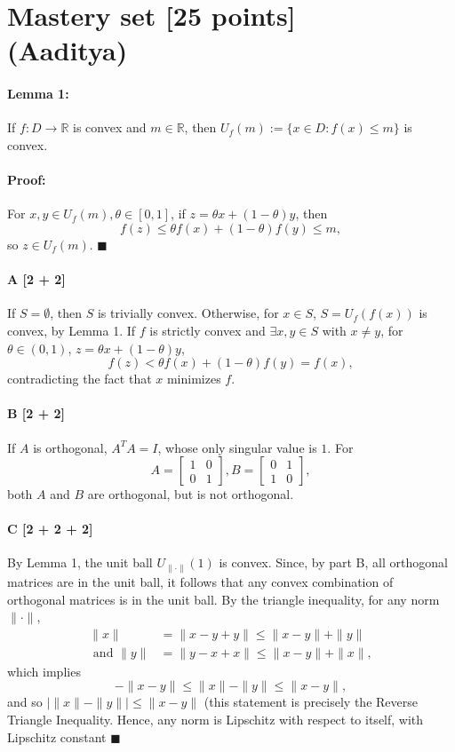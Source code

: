 \documentclass[11pt]{article}
\newcommand{\qed}{\quad \ensuremath{\blacksquare}}
\newcommand{\R}{\mathbb{R}}
\begin{document}
\twocolumn
\section{Mastery set [25 points]\\(Aaditya)}
\paragraph{Lemma 1:} If $f : D \to \R$ is convex and $m \in \R$, then
$U_f(m) := \{ x \in D : f(x) \leq m \}$ is convex.

\paragraph{Proof:} For $x,y \in U_f(m), \theta \in [0,1]$, if
$z=\theta x+(1-\theta)y$, then
\[f(z) \leq \theta f(x) + (1 - \theta)f(y) \leq m,\] so
$z \in U_f(m)$. \qed

\paragraph{A [2 + 2]} If $S = \emptyset$, then $S$ is trivially convex.
Otherwise, for $x \in S$, $S = U_f(f(x))$ is convex, by Lemma 1. If $f$ is
strictly convex and $\exists x,y \in S$ with $x \neq y$, for
$\theta \in (0,1)$, $z = \theta x + (1 - \theta)y$,
\[f(z) < \theta f(x) + (1 - \theta)f(y) = f(x),\]
contradicting the fact that $x$ minimizes $f$.

\paragraph{B [2 + 2]} If $A$ is orthogonal, $A^TA = I$, whose only singular
value is $1$. For
\[A =
\begin{bmatrix}
    1 & 0 \\
    0 & 1
\end{bmatrix},
B =
\begin{bmatrix}
    0 & 1 \\
    1 & 0
\end{bmatrix},
\]
both $A$ and $B$ are orthogonal, but  is not
orthogonal.

\paragraph{C [2 + 2 + 2]} By Lemma 1, the unit ball $U_{\|\cdot\|}(1)$ is
convex. Since, by part B, all orthogonal matrices are in the unit ball, it
follows that any convex combination of orthogonal matrices is in the unit ball.
By the triangle inequality, for any norm $\|\cdot\|$,
\begin{align*}
                \|x\| & = \|x - y + y\| \leq \|x - y\| + \|y\|  \\
\mbox{ and }    \|y\| & = \|y - x + x\| \leq \|x - y\| + \|x\|,
\end{align*}
which implies
\[-\|x - y\| \leq \|x\| - \|y\| \leq \|x - y\|,\]
and so $|\|x\| - \|y\|| \leq \|x - y\|$ (this statement is precisely the
Reverse Triangle Inequality. Hence, any norm is Lipschitz with respect to
itself, with Lipschitz constant  \qed
\end{document}
